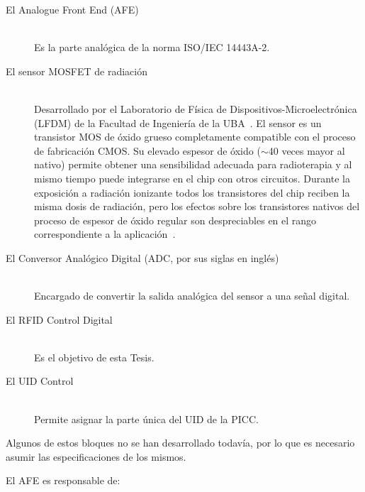 \documentclass[a4paper, twoside, 11pt]{report}
\begin{document}
\begin{description}
  \item[El Analogue Front End (AFE)] \hfill \\ Es la parte analógica de la norma ISO/IEC 14443A-2.
  \item[El sensor MOSFET de radiación] \hfill \\ Desarrollado por el Laboratorio de Física de Dispositivos-Microelectrónica (LFDM) de la Facultad de Ingeniería de la UBA~\cite{Lipovetzky_2013}\cite{mosfet_mismatch_amplification}\cite{6MV_LINAC}. El sensor es un transistor MOS de óxido grueso completamente compatible con el proceso de fabricación CMOS. Su elevado espesor de óxido ($\sim$40 veces mayor al nativo) permite obtener una sensibilidad adecuada para radioterapia y al mismo tiempo puede integrarse en el chip con otros circuitos. Durante la exposición a radiación ionizante todos los transistores del chip reciben la misma dosis de radiación, pero  los efectos sobre los transistores nativos del proceso de espesor de óxido regular son despreciables en el rango correspondiente a la aplicación~\cite{Saks_1984}.
  \item[El Conversor Analógico Digital (ADC, por sus siglas en inglés)] \hfill \\ Encargado de convertir la salida analógica del sensor a una señal digital.
  \item[El RFID Control Digital] \hfill \\ Es el objetivo de esta Tesis.
  \item[El UID Control] \hfill \\ Permite asignar la parte única del UID de la PICC.
\end{description}

Algunos de estos bloques no se han desarrollado todavía, por lo que es necesario asumir las especificaciones de los mismos.

El AFE es responsable de:
\end{document}
